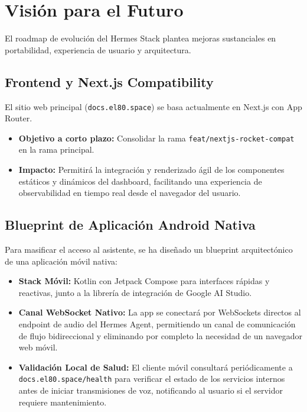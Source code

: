 \documentclass[12pt,a4paper,openany]{book}
\newcommand{\code}[1]{\texttt{\small#1}}
\newcommand{\domain}[1]{\texttt{\color{hermesblue}#1}}
\begin{document}
\chapter{Visión para el Futuro}
El roadmap de evolución del Hermes Stack plantea mejoras sustanciales en portabilidad, experiencia de usuario y arquitectura.

\section{Frontend y Next.js Compatibility}
El sitio web principal (\domain{docs.el80.space}) se basa actualmente en Next.js con App Router.
\begin{itemize}
    \item \textbf{Objetivo a corto plazo:} Consolidar la rama \code{feat/nextjs-rocket-compat} en la rama principal.
    \item \textbf{Impacto:} Permitirá la integración y renderizado ágil de los componentes estáticos y dinámicos del dashboard, facilitando una experiencia de observabilidad en tiempo real desde el navegador del usuario.
\end{itemize}

\section{Blueprint de Aplicación Android Nativa}
Para masificar el acceso al asistente, se ha diseñado un blueprint arquitectónico de una aplicación móvil nativa:
\begin{itemize}
    \item \textbf{Stack Móvil:} Kotlin con Jetpack Compose para interfaces rápidas y reactivas, junto a la librería de integración de Google AI Studio.
    \item \textbf{Canal WebSocket Nativo:} La app se conectará por WebSockets directos al endpoint de audio del Hermes Agent, permitiendo un canal de comunicación de flujo bidireccional y eliminando por completo la necesidad de un navegador web móvil.
    \item \textbf{Validación Local de Salud:} El cliente móvil consultará periódicamente a \code{docs.el80.space/health} para verificar el estado de los servicios internos antes de iniciar transmisiones de voz, notificando al usuario si el servidor requiere mantenimiento.
\end{itemize}
\end{document}
